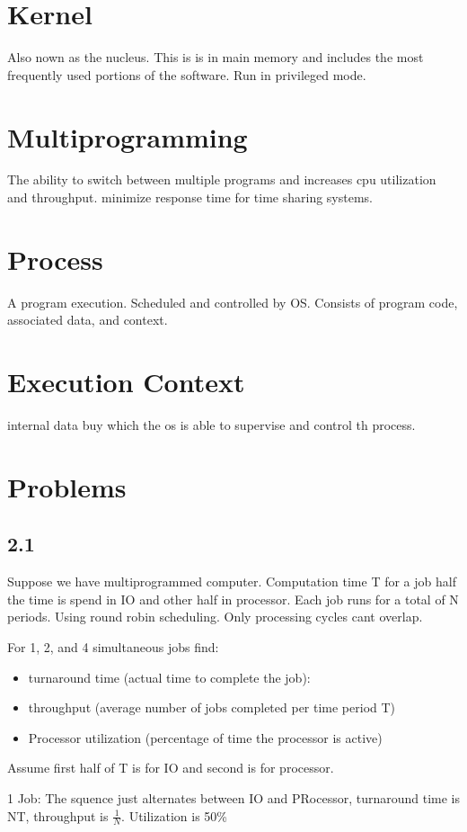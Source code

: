 \documentclass[12pt]{article}
\begin{document}
\section{Kernel}
Also nown as the nucleus. This is is in main memory and includes the most frequently used portions of the software. Run in privileged mode.

\section{Multiprogramming}
The ability to switch between multiple programs and increases cpu utilization and throughput. minimize response time for time sharing systems.

\section{Process}
A program execution. Scheduled and controlled by OS. Consists of program code, associated data, and context.

\section{Execution Context}
internal data buy which the os is able to supervise and control th process.

\section{Problems}
\subsection{2.1}
Suppose we have multiprogrammed computer. Computation time T for a job half the time is spend in IO and other half in processor. Each job runs for a total of N periods. Using round robin scheduling. Only processing cycles cant overlap.

For 1, 2, and 4 simultaneous jobs find:
\begin{itemize}
    \item turnaround time (actual time to complete the job):
    \item throughput (average number of jobs completed per time period T)
    \item Processor utilization (percentage of time the processor is active)
\end{itemize}
Assume first half of T is for IO and second is for processor.

1 Job: The squence just alternates between IO and PRocessor, turnaround time is NT, throughput is $\frac{1}{N}$. Utilization is 50\%
\end{document}
